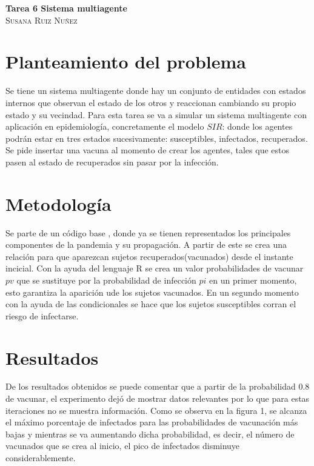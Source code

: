 \documentclass{article}
\begin{document}
	\begin{center}
	\huge{\textbf{Tarea 6 Sistema multiagente}}\\
	
	\textsc{ \Large Susana Ruiz Nuñez}
	\end{center}


\section{Planteamiento del problema} 
Se tiene un sistema multiagente \cite{satu} donde hay un conjunto de entidades con estados internos que observan el estado de los otros y reaccionan cambiando su propio estado y su vecindad. Para esta tarea se va a simular un sistema multiagente con aplicación en epidemiología, concretamente el modelo $SIR$: donde los agentes podrán estar en tres estados sucesivamente: susceptibles, infectados, recuperados. Se pide insertar una vacuna al momento de crear los agentes, tales que estos pasen al estado de recuperados sin pasar por la infección.  

\section{Metodología}
Se parte de un código base \cite{satu}, donde ya se tienen representados los principales componentes de la pandemia y su propagación. A partir de este se crea una relación para que aparezcan sujetos recuperados(vacunados) desde el instante incicial. Con la ayuda del lenguaje R se crea un valor probabilidades de vacunar $pv$ que se sustituye por la probabilidad de infección $pi$ en un primer momento, esto garantiza la aparición ude los sujetos vacunados. En un segundo momento con la ayuda de las condicionales se hace que los sujetos susceptibles corran el riesgo de infectarse.




\section{Resultados}
De los resultados obtenidos se puede comentar que a partir de la probabilidad 0.8 de vacunar, el experimento dejó de mostrar datos relevantes por lo que para estas iteraciones no se muestra información. Como se observa en la figura 1, se alcanza el máximo porcentaje de infectados para las probabilidades de vacunación más bajas y mientras se va aumentando dicha probabilidad, es decir, el número de vacunados que se crea al inicio, el pico de infectados disminuye considerablemente.  
\end{document}
